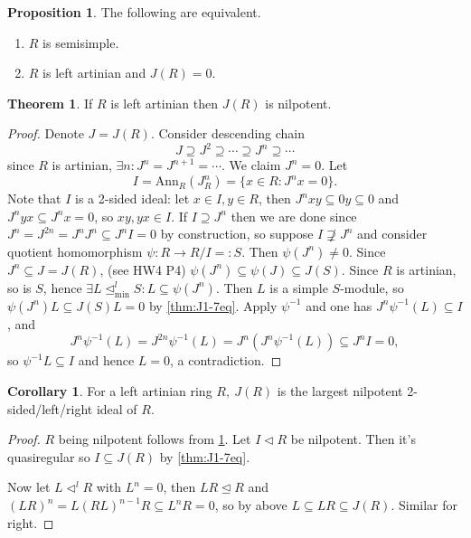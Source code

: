 \documentclass[a4paper]{article}
\newcommand{\Ann}{\text{Ann}}
\theoremstyle{definition}
\newtheorem{prop}[defn]{Proposition}
\newtheorem{thm}[defn]{Theorem}
\newtheorem{coro}[defn]{Corollary}
\begin{document}
\begin{prop}
The following are equivalent.
\begin{enumerate}
\item $R$ is semisimple.
\item $R$ is left artinian and $J(R)=0$.
\end{enumerate}
\end{prop}

\begin{thm}
\label{thm:artinRhasnilpJR}
If $R$ is left artinian then $J(R)$ is nilpotent.
\end{thm}
\begin{proof}
Denote $J=J(R)$. Consider descending chain
\[
J\supseteq J^2\supseteq\cdots\supseteq J^n\supseteq\cdots
\]
since $R$ is artinian, $\exists n:J^n=J^{n+1}=\cdots$. We claim $J^n=0$. Let
\[
I=\Ann_R(J^n_R)=\{x\in R:J^nx=0\}.
\]
Note that $I$ is a 2-sided ideal: let $x\in I,y\in R$, then $J^nxy\subseteq 0y\subseteq 0$ and $J^nyx\subseteq J^nx=0$, so $xy,yx\in I$. If $I\supseteq J^n$ then we are done since $J^n=J^{2n}=J^nJ^n\subseteq J^n I=0$ by construction, so suppose $I\not\supsetneq J^n$ and consider quotient homomorphism $\psi:R\rightarrow R/I=:S$. Then $\psi(J^n)\neq 0$. Since $J^n\subseteq J=J(R)$, (see HW4 P4) $\psi(J^n)\subseteq \psi(J)\subseteq J(S)$. Since $R$ is artinian, so is $S$, hence $\exists L\unlhd_{\text{min}}^l S:L\subseteq\psi(J^n)$. Then $L$ is a simple $S$-module, so $\psi(J^n)L\subseteq J(S)L=0$ by \ref{thm:J1-7eq}. Apply $\psi^{-1}$ and one has $J^n\psi^{-1}(L)\subseteq I$, and
\[
J^n\psi^{-1}(L)=J^{2n}\psi^{-1}(L)=J^n(J^n\psi^{-1}(L))\subseteq J^nI=0,
\]
so $\psi^{-1}L\subseteq I$ and hence $L=0$, a contradiction.
\end{proof}

\begin{coro}
For a left artinian ring $R,\ J(R)$ is the largest nilpotent 2-sided/left/right ideal of $R$.
\end{coro}
\begin{proof}
$R$ being nilpotent follows from \ref{thm:artinRhasnilpJR}. Let $I\lhd R$ be nilpotent. Then it's quasiregular so $I\subseteq J(R)$ by \ref{thm:J1-7eq}.

Now let $L\lhd^l R$ with $L^n=0$, then $LR\unlhd R$ and $(LR)^n=L(RL)^{n-1}R\subseteq L^nR=0$, so by above $L\subseteq LR\subseteq J(R)$. Similar for right.
\end{proof}
\end{document}

